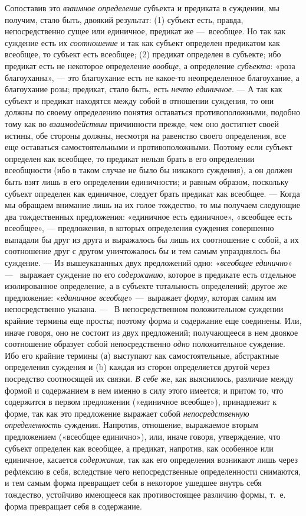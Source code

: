 \documentclass[twoside]{article}
\begin{document}
{{{{Сопоставив это
{\em взаимное определение}
субъекта и предиката в суждении, мы получим, стало быть,
двоякий результат: (1) субъект есть, правда, непосредственно сущее или
единичное, предикат же —~всеобщее. Но так как суждение есть
их {\em соотношение} и
так как субъект определен предикатом как всеобщее, то субъект есть
всеобщее; (2) предикат определен в субъекте; ибо предикат есть не некоторое
определение {\em вообще},
а определение
{\em субъекта}: «роза
благоуханна», — это благоухание есть не какое-то
неопределенное благоухание, а благоухание розы; предикат, стало быть, есть
{\em нечто единичное}. —
А так как субъект и предикат находятся между собой в
отношении суждения, то они должны по своему определению понятия оставаться
противоположными, подобно тому как во
{\em взаимодействии}
причинности прежде, чем оно достигнет своей истины, обе
стороны должны, несмотря на равенство своего определения, все еще
оставаться самостоятельными и противоположными. Поэтому если субъект
определен как всеобщее, то предикат нельзя брать в его определении
всеобщности (ибо в таком случае не было бы никакого
суждения), а он должен быть взят лишь в его определении
единичности; и равным образом, поскольку субъект определен как единичное,
следует брать предикат как всеобщее. — Когда мы обращаем
внимание лишь на их голое тождество, то мы получаем следующие два
тождественных предложения:\label{bkm:bm35a}
«единичное есть единичное»,
«всеобщее есть всеобщее», — предложения, в
которых определения суждения совершенно выпадали бы друг из друга и
выражалось бы лишь их соотношение с собой, а их соотношение друг с другом
уничтожалось бы и тем самым упразднялось бы суждение. — Из
вышеуказанных двух предложений одно:
«{\em всеобщее единично}» —~
выражает суждение по его
{\em содержанию}, которое
в предикате есть отдельное изолированное определение, а в субъекте
тотальность определений; другое же предложение:
«{\em единичное всеобще}»
—~выражает {\em форму},
которая самим им непосредственно указана. —
\ В непосредственном положительном суждении крайние термины
еще просты; поэтому форма и содержание еще соединены. Или, иначе говоря,
оно не состоит из двух предложений; получающееся в нем двоякое соотношение
образует собой непосредственно
{\em одно} положительное
суждение. Ибо его крайние термины (а) выступают как самостоятельные,
абстрактные определения суждения и (b) каждая из сторон определяется другой
через посредство соотносящей их связки.
{\em В себе} же, как
выяснилось, различие между формой и содержанием в нем именно в силу этого
имеется; и притом то, что содержится в первом предложении («единичное
всеобще»), принадлежит к форме, так как это предложение выражает собой
{\em непосредственную определенность}
суждения. Напротив, отношение, выражаемое вторым предложением
(«всеобщее единично»), или, иначе говоря, утверждение, что субъект
определен как всеобщее, а предикат, напротив, как особенное или единичное,
касается {\em содержания},
так как его определения возникают лишь через рефлексию в
себя, вследствие чего непосредственные определенности снимаются, и тем
самым форма превращает себя в некоторое ушедшее внутрь себя тождество,
устойчиво имеющееся как противостоящее различию формы, т.~е. форма
превращает себя в содержание.

}}}}
\end{document}
